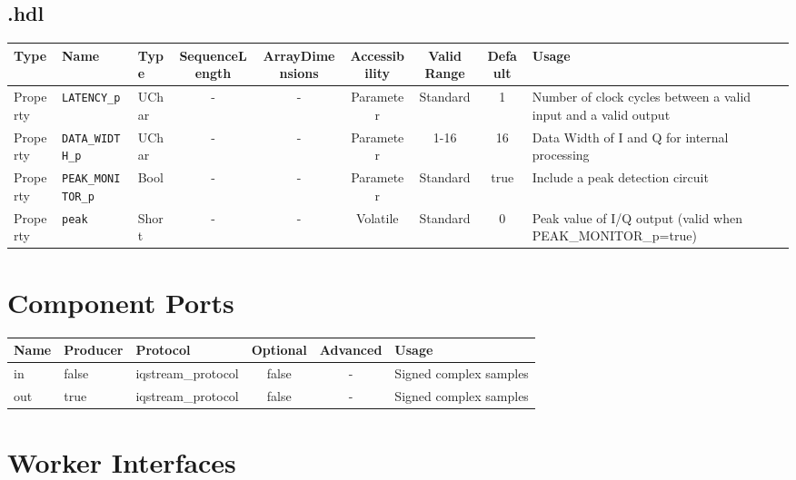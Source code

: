 \begin{landscape}
\subsection*{\comp.hdl}
\begin{scriptsize}
	\begin{tabular}{|p{3cm}|p{2cm}|p{1cm}|c|c|c|c|c|p{5cm}|}
		\hline
		\rowcolor{blue}
		Type     & Name                  & Type  & SequenceLength & ArrayDimensions & Accessibility      & Valid Range & Default & Usage                                                    \\
		\hline
		Property & \verb+LATENCY_p+ 	  & UChar& -              & -               & Parameter & Standard    & 1       & Number of clock cycles between a valid input and a valid output \\
		\hline
		Property & \verb+DATA_WIDTH_p+   & UChar & -              & -               & Parameter & 1-16        & 16      & Data Width of I and Q for internal processing\\
		\hline
		Property & \verb+PEAK_MONITOR_p+ & Bool  & -              & -               & Parameter & Standard    & true    & Include a peak detection circuit                         \\
		\hline
		Property & \verb+peak+           & Short & -              & -               & Volatile           & Standard    & 0       & Peak value of I/Q output (valid when PEAK\_MONITOR\_p=true)\\
		\hline
	\end{tabular}
\end{scriptsize}

\section*{Component Ports}
\begin{scriptsize}
	\begin{tabular}{|M{2cm}|M{1.5cm}|M{4cm}|c|c|M{9cm}|}
		\hline
		Name & Producer & Protocol           & Optional & Advanced & Usage                  \\
		\hline
		in   & false    & iqstream\_protocol & false    & -        & Signed complex samples \\
		\hline
		out  & true     & iqstream\_protocol & false    & -        & Signed complex samples \\
		\hline
	\end{tabular}
\end{scriptsize}

\section*{Worker Interfaces}

\end{landscape}
